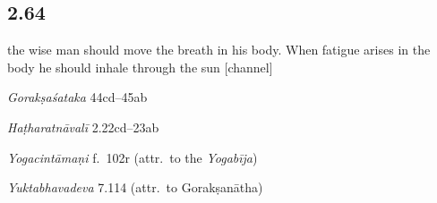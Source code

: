 \begin{ekdosis}
\subsection*{2.64}
\begin{translation}[hp02_064]
[...] the wise man should move the breath in his body. When fatigue arises in the body he should inhale through the sun [channel]
\end{translation}

\begin{sources}[hp02_064]
\emph{Gorakṣaśataka} 44cd–45ab

\begin{versinnote}
\end{versinnote}
\end{sources}

\begin{testimonia}[hp02_064]
\emph{Haṭharatnāvalī} 2.22cd–23ab

\begin{versinnote}
\end{versinnote}

\emph{Yogacintāmaṇi} f.~102r (attr.~to the \emph{Yogabīja})

\begin{versinnote}
\end{versinnote}

\emph{Yuktabhavadeva} 7.114 (attr.~to Gorakṣanātha)

\begin{versinnote}
\end{versinnote}
\end{testimonia}


\end{ekdosis}
